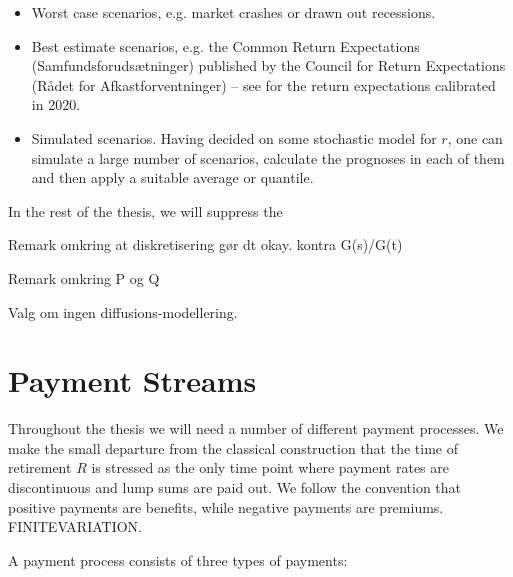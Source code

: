 \documentclass{book}
\newcommand{\1}[1]{\mathbbm{1}_{\left\lbrace #1 \right\rbrace}}
\theoremstyle{break}
\theoremstyle{remark}
\newenvironment{remark}
  {\pushQED{\qed}\renewcommand{\qedsymbol}{\scalebox{1.4}{$\circ$}}\remarkx}
  {\popQED\endremarkx}
\numberwithin{equation}{section}
\begin{document}
\begin{itemize}
	\item Worst case scenarios, e.g. market crashes or drawn out recessions.
	\item Best estimate scenarios, e.g. the Common Return Expectations (Samfundsforudsætninger) published by the Council for Return Expectations (Rådet for Afkastforventninger) -- see \cite{ReturnExpectations2020} for the return expectations calibrated in 2020.
	\item Simulated scenarios. Having decided on some stochastic model for $r$, one can simulate a large number of scenarios, calculate the prognoses in each of them and then apply a suitable average or quantile.
\end{itemize}

In the rest of the thesis, we will suppress the 

\begin{remark}
	Remark omkring at diskretisering gør dt okay. kontra G(s)/G(t)
\end{remark}

\begin{remark}
	Remark omkring P og Q
\end{remark}

Valg om ingen diffusions-modellering.

\section{Payment Streams}

Throughout the thesis we will need a number of different payment processes. We make the small departure from the classical construction that the time of retirement $R$ is stressed as the only time point where payment rates are discontinuous and lump sums are paid out. We follow the convention that positive payments are benefits, while negative payments are premiums. FINITEVARIATION.

A payment process consists of three types of payments:
\end{document}
